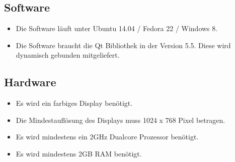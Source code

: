 \subsection{Software}
\begin{itemize}
\item Die Software läuft unter Ubuntu 14.04 / Fedora 22 / Windows 8. 
\item Die Software braucht die Qt Bibliothek in der Version 5.5. Diese wird dynamisch gebunden mitgeliefert.
\end{itemize}
\subsection{Hardware}
\begin{itemize}
\item Es wird ein farbiges Display benötigt. 
\item Die Mindestauflösung des Displays muss 1024 x 768 Pixel betragen.
\item Es wird mindestens ein 2GHz Dualcore Prozessor benötigt.
\item Es wird mindestens 2GB RAM benötigt.
\end{itemize}

